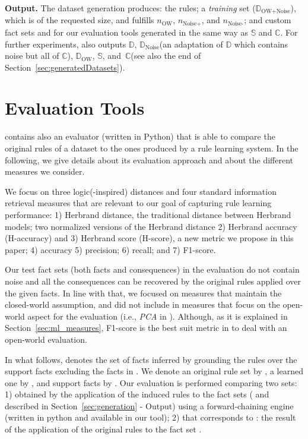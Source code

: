 \documentclass[letterpaper]{article} \usepackage{aaai20}  \usepackage{times}  \usepackage{helvet} \usepackage{courier}  \usepackage[hyphens]{url}  \usepackage{graphicx} \urlstyle{rm} \def\UrlFont{\rm}  \usepackage{graphicx}  \frenchspacing  \setlength{\pdfpagewidth}{8.5in}  \setlength{\pdfpageheight}{11in}  \usepackage{amsthm}
\theoremstyle{definition}
\newcommand{\tool}{\text{RuDaS}\xspace}
\newcommand{\nowa}{\ensuremath{n_{\text{OW}}}\xspace}
\newcommand{\nnoiseadd}{\ensuremath{n_{\text{Noise+}}}\xspace}
\newcommand{\nnoisemiss}{\ensuremath{n_{\text{Noise-}}}\xspace}
\newcommand{\db}{\ensuremath{\mathbb{D}}\xspace}\newcommand{\dbowa}{\ensuremath{\db_{\text{OW}}}\xspace}
\newcommand{\dbowan}{\ensuremath{\db_{\text{OW+Noise}}}\xspace}
\newcommand{\dbn}{\ensuremath{\db_{\text{Noise}}}\xspace}
\newcommand{\sfacts}{\ensuremath{\mathbb{S}}\xspace}
\newcommand{\cfacts}{\ensuremath{\mathbb{C}}\xspace}
\begin{document}
\textbf{Output.}
The dataset generation produces:
the rules; a \emph{training} set (\dbowan), which is of the requested size, and fulfills \nowa, \nnoiseadd, and \nnoisemiss; and custom fact sets  and  for our evaluation tools generated in the same way as \sfacts and \cfacts. 
For further experiments, \tool 
also outputs \db, \dbn (an adaptation of \db which contains noise but all of \cfacts), \dbowa, \sfacts, and~\cfacts (see also the end of Section~\ref{sec:generatedDatasets}).

\section{Evaluation Tools}\label{sec:evaluation}

\tool contains also an evaluator (written in Python) that is able to compare the original rules of a dataset to the ones produced by a rule learning system. 
In the following, we give details about its evaluation approach and about the different measures we consider.

We focus on three logic(-inspired) distances and four standard information retrieval measures that are relevant to our goal of capturing rule learning performance: 
1) Herbrand distance, the traditional {distance between Herbrand models}; two normalized versions of the Herbrand distance 2) Herbrand accuracy (H-accuracy) and 3) Herbrand score (H-score), a new metric we propose in this paper; 4) accuracy 5) precision;  6) recall; and 7) F1-score. 




Our test fact sets (both facts and consequences) in the evaluation do not contain noise and all the consequences can be recovered by the original rules applied over the given facts. In line with that, we focused on measures that maintain the closed-world assumption, and did not include in \tool measures that focus on the open-world aspect for the evaluation (i.e., {\it PCA} in \cite{Galarraga+-VLDBJ15:amiep}). 
Although, as it is explained in Section~\ref{sec:ml_measures}, F1-score is the best suit metric in \tool to deal with an open-world evaluation. 

In what follows,  denotes the set of facts inferred by grounding the rules  over the support facts  excluding the facts in .
We denote an original rule set by , a learned one by , and  support facts by .
Our evaluation is performed comparing two sets: 
1)  obtained by the application of the induced rules  to the fact sets  ( and  described in Section~\ref{sec:generation} - Output) using a forward-chaining engine (written in python and available in our tool);
2)  that corresponds to : the result of the application of the original rules  to the fact set .
\end{document}
